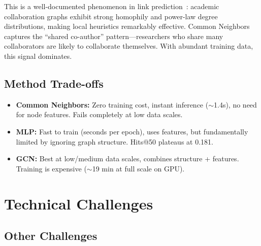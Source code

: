 \documentclass[12pt,a4paper]{article}
\begin{document}
This is a well-documented phenomenon in link prediction~\cite{zhang2020}: academic collaboration graphs exhibit strong homophily and power-law degree distributions, making local heuristics remarkably effective. Common Neighbors captures the ``shared co-author'' pattern—researchers who share many collaborators are likely to collaborate themselves. With abundant training data, this signal dominates.

\subsection{Method Trade-offs}

\begin{itemize}[nosep]
    \item \textbf{Common Neighbors:} Zero training cost, instant inference ($\sim$1.4s), no need for node features. Fails completely at low data scales.
    \item \textbf{MLP:} Fast to train (seconds per epoch), uses features, but fundamentally limited by ignoring graph structure. Hits@50 plateaus at 0.181.
    \item \textbf{GCN:} Best at low/medium data scales, combines structure + features. Training is expensive ($\sim$19 min at full scale on GPU).
\end{itemize}

\section{Technical Challenges}
\label{sec:challenges}

\subsection{Other Challenges}
\end{document}
